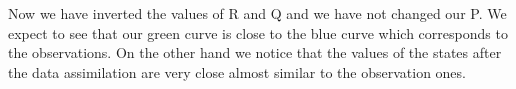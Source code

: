 Now we have inverted the values of R and Q and we have not changed our P. We expect to see that our green curve is close to the blue curve which corresponds to the observations. On the other hand we notice that the values of the states after the data assimilation are very close almost similar to the observation ones.
